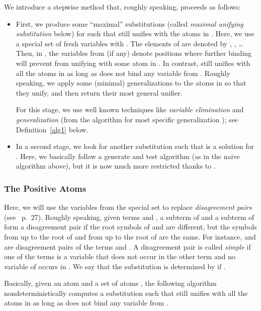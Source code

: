 \documentclass[fleqn]{tlp}
\begin{document}
We introduce a stepwise method that, roughly speaking, proceeds as
follows:
\begin{itemize}
\item First, we produce some ``maximal'' substitutions 
  (called \emph{maximal unifying substitution} below) for  such
  that  still unifies with the atoms in . Here, we use
  a special set  of fresh variables with
  . The elements of
   are denoted by , , \dots{} Then, in , the
  variables from  (if any) denote positions where further binding
  will prevent  from unifying with some atom in . In
  contrast,  still unifies with all the atoms in
   as long as  does not bind any variable from .
Roughly speaking, we apply some (minimal) generalizations to the
  atoms in  so that they unify, and then return their most
  general unifier.

  For this stage, we use well known techniques like \emph{variable
    elimination} \cite{MM82}
  and \emph{generalization} (from the algorithm for most specific
  generalization \cite{Plo70}); see Definition~\ref{alg1} below.

\item In a second stage, we look for another substitution 
  such that  is a solution for . Here, we
  basically follow a generate and test algorithm (as in the naive
  algorithm above), but it is now much more restricted thanks to
  .
\end{itemize}

\subsubsection{The Positive Atoms}
\label{section-algo-all-pos}


Here, we will use the variables from the special set  to
replace \emph{disagreement pairs}
(see~\cite{Apt97} p.~27).
Roughly speaking, given terms  and , a subterm  of  and a
subterm  of  form a disagreement pair if the root symbols of
 and  are different, but the symbols from  up to the root of
 and from  up to the root of  are the same. For instance,
 and  are disagreement pairs of the terms 
and .
A disagreement pair  is called \emph{simple}
if one of the terms is a variable that does not occur in the other
term and no variable of  occurs in .  We say that
the substitution  is determined by  if
.

Basically, given an atom  and a set of atoms , the following
algorithm nondeterministically computes a substitution  such
that  still unifies with all the atoms in  as
long as  does not bind any variable from .
\end{document}
